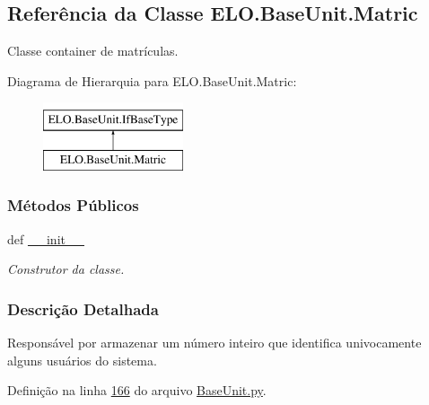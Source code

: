 \hypertarget{classELO_1_1BaseUnit_1_1Matric}{\subsection{Referência da Classe E\-L\-O.\-Base\-Unit.\-Matric}
\label{classELO_1_1BaseUnit_1_1Matric}
}


Classe container de matrículas.  


Diagrama de Hierarquia para E\-L\-O.\-Base\-Unit.\-Matric\-:\begin{figure}[H]
\begin{center}
\leavevmode
\includegraphics[height=2.000000cm]{d6/db2/classELO_1_1BaseUnit_1_1Matric}
\end{center}
\end{figure}
\subsubsection*{Métodos Públicos}
\begin{DoxyCompactItemize}
\item 
def \hyperlink{classELO_1_1BaseUnit_1_1Matric_a050299f6e8d99a530a4598270b93b8d9}{\-\_\-\-\_\-init\-\_\-\-\_\-}
\begin{DoxyCompactList}\small\item\em Construtor da classe. \end{DoxyCompactList}\end{DoxyCompactItemize}


\subsubsection{Descrição Detalhada}
Responsável por armazenar um número inteiro que identifica univocamente alguns usuários do sistema. 

Definição na linha \hyperlink{BaseUnit_8py_source_l00166}{166} do arquivo \hyperlink{BaseUnit_8py_source}{Base\-Unit.\-py}.



